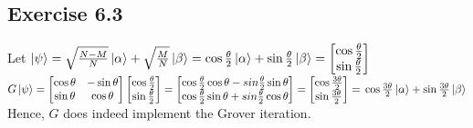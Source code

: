 \documentclass[a4paper,12pt]{article}
\begin{document}
\subsection*{Exercise 6.3}
Let $\ket{\psi}=\sqrt{\frac{N-M}{N}}\ket{\alpha}+\sqrt{\frac{M}{N}}\ket{\beta}=
\cos\frac{\theta}{2}\ket{\alpha}+\sin\frac{\theta}{2}\ket{\beta}=\begin{bmatrix}
    \cos\frac{\theta}{2}\\
    \sin\frac{\theta}{2}
\end{bmatrix}$\\
$G\ket{\psi}=\begin{bmatrix}
    \cos\theta&-\sin\theta\\
    \sin\theta&\cos\theta
\end{bmatrix}
\begin{bmatrix}
    \cos\frac{\theta}{2}\\
    \sin\frac{\theta}{2}
\end{bmatrix}=\begin{bmatrix}
    \cos\frac{\theta}{2}\cos\theta-sin\frac{\theta}{2}\sin\theta\\
    \cos\frac{\theta}{2}\sin\theta+sin\frac{\theta}{2}\cos\theta 
\end{bmatrix}=
\begin{bmatrix}
    \cos\frac{3\theta}{2}\\
    \sin\frac{3\theta}{2}
\end{bmatrix}=\\
\cos\frac{3\theta}{2}\ket{\alpha}+\sin\frac{3\theta}{2}\ket{\beta}$\\
Hence, $G$ does indeed implement the Grover iteration.
\end{document}
